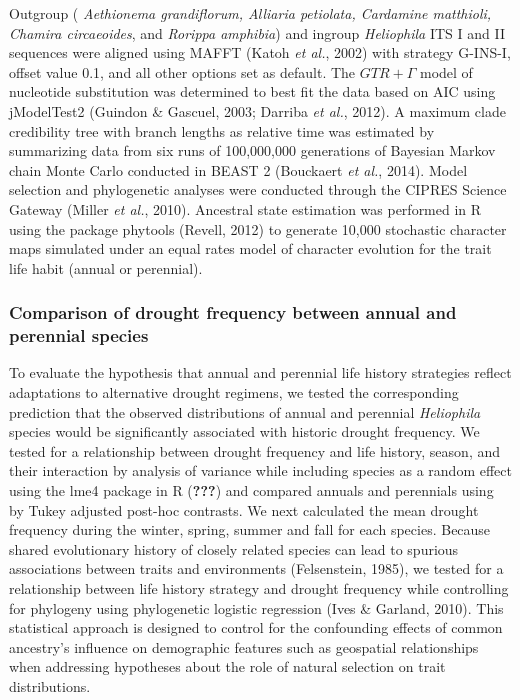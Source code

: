 \documentclass[man,floatsintext]{apa6}
\theoremstyle{definition}
\theoremstyle{definition}
\theoremstyle{definition}
\theoremstyle{remark}
\begin{document}
Outgroup ( \emph{Aethionema grandiflorum, Alliaria petiolata, Cardamine
matthioli, Chamira circaeoides}, and \emph{Rorippa amphibia}) and
ingroup \emph{Heliophila} ITS I and II sequences were aligned using
MAFFT (Katoh \emph{et al.}, 2002) with strategy G-INS-I, offset value
0.1, and all other options set as default. The \(GTR + \Gamma\) model of
nucleotide substitution was determined to best fit the data based on AIC
using jModelTest2 (Guindon \& Gascuel, 2003; Darriba \emph{et al.},
2012). A maximum clade credibility tree with branch lengths as relative
time was estimated by summarizing data from six runs of 100,000,000
generations of Bayesian Markov chain Monte Carlo conducted in BEAST 2
(Bouckaert \emph{et al.}, 2014). Model selection and phylogenetic
analyses were conducted through the CIPRES Science Gateway (Miller
\emph{et al.}, 2010). Ancestral state estimation was performed in R
using the package phytools (Revell, 2012) to generate 10,000 stochastic
character maps simulated under an equal rates model of character
evolution for the trait life habit (annual or perennial).

\hypertarget{comparison-of-drought-frequency-between-annual-and-perennial-species}{%
\subsubsection{Comparison of drought frequency between annual and
perennial
species}\label{comparison-of-drought-frequency-between-annual-and-perennial-species}}

To evaluate the hypothesis that annual and perennial life history
strategies reflect adaptations to alternative drought regimens, we
tested the corresponding prediction that the observed distributions of
annual and perennial \emph{Heliophila} species would be significantly
associated with historic drought frequency. We tested for a relationship
between drought frequency and life history, season, and their
interaction by analysis of variance while including species as a random
effect using the lme4 package in R ({\textbf{???}}) and compared annuals
and perennials using by Tukey adjusted post-hoc contrasts. We next
calculated the mean drought frequency during the winter, spring, summer
and fall for each species. Because shared evolutionary history of
closely related species can lead to spurious associations between traits
and environments (Felsenstein, 1985), we tested for a relationship
between life history strategy and drought frequency while controlling
for phylogeny using phylogenetic logistic regression (Ives \& Garland,
2010). This statistical approach is designed to control for the
confounding effects of common ancestry's influence on demographic
features such as geospatial relationships when addressing hypotheses
about the role of natural selection on trait distributions.
\end{document}
